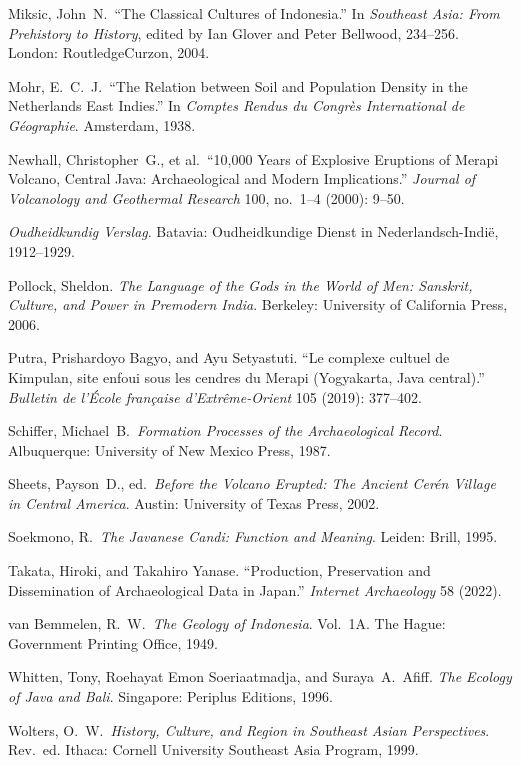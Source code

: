 \documentclass[12pt,a4paper]{article}
\begin{document}
\vspace{0.5em}
\noindent Miksic, John~N.\ ``The Classical Cultures of Indonesia.'' In \emph{Southeast Asia: From Prehistory to History}, edited by Ian Glover and Peter Bellwood, 234--256. London: RoutledgeCurzon, 2004.

\vspace{0.5em}
\noindent Mohr, E.~C.~J.\ ``The Relation between Soil and Population Density in the Netherlands East Indies.'' In \emph{Comptes Rendus du Congr\`{e}s International de G\'{e}ographie}. Amsterdam, 1938.

\vspace{0.5em}
\noindent Newhall, Christopher~G., et al.\ ``10,000 Years of Explosive Eruptions of Merapi Volcano, Central Java: Archaeological and Modern Implications.'' \emph{Journal of Volcanology and Geothermal Research} 100, no.~1--4 (2000): 9--50.

\vspace{0.5em}
\noindent \emph{Oudheidkundig Verslag}. Batavia: Oudheidkundige Dienst in Nederlandsch-Indi\"{e}, 1912--1929.

\vspace{0.5em}
\noindent Pollock, Sheldon. \emph{The Language of the Gods in the World of Men: Sanskrit, Culture, and Power in Premodern India}. Berkeley: University of California Press, 2006.

\vspace{0.5em}
\noindent Putra, Prishardoyo Bagyo, and Ayu Setyastuti. ``Le complexe cultuel de Kimpulan, site enfoui sous les cendres du Merapi (Yogyakarta, Java central).'' \emph{Bulletin de l'\'{E}cole fran\c{c}aise d'Extr\^{e}me-Orient} 105 (2019): 377--402.

\vspace{0.5em}
\noindent Schiffer, Michael~B.\ \emph{Formation Processes of the Archaeological Record}. Albuquerque: University of New Mexico Press, 1987.

\vspace{0.5em}
\noindent Sheets, Payson~D., ed.\ \emph{Before the Volcano Erupted: The Ancient Cer\'{e}n Village in Central America}. Austin: University of Texas Press, 2002.

\vspace{0.5em}
\noindent Soekmono, R.\ \emph{The Javanese Candi: Function and Meaning}. Leiden: Brill, 1995.

\vspace{0.5em}
\noindent Takata, Hiroki, and Takahiro Yanase. ``Production, Preservation and Dissemination of Archaeological Data in Japan.'' \emph{Internet Archaeology} 58 (2022).

\vspace{0.5em}
\noindent van Bemmelen, R.~W.\ \emph{The Geology of Indonesia}. Vol.~1A. The Hague: Government Printing Office, 1949.

\vspace{0.5em}
\noindent Whitten, Tony, Roehayat Emon Soeriaatmadja, and Suraya~A.\ Afiff. \emph{The Ecology of Java and Bali}. Singapore: Periplus Editions, 1996.

\vspace{0.5em}
\noindent Wolters, O.~W.\ \emph{History, Culture, and Region in Southeast Asian Perspectives}. Rev.\ ed. Ithaca: Cornell University Southeast Asia Program, 1999.
\end{document}
